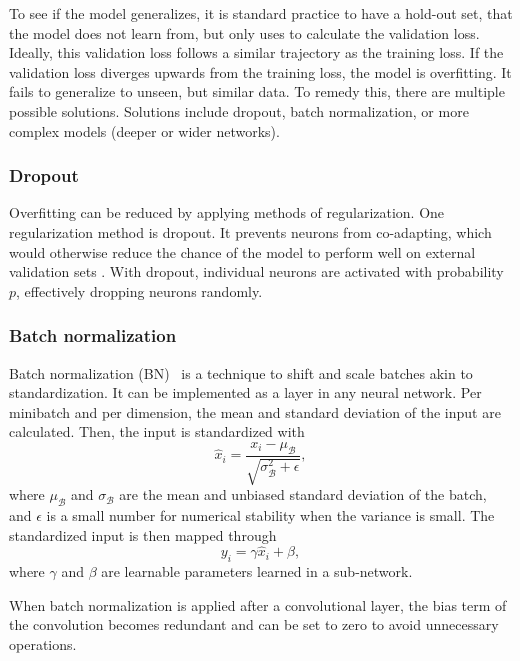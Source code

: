 To see if the model generalizes, it is standard practice to have a hold-out set, that the model does not learn from, but only uses to calculate the validation loss.
Ideally, this validation loss follows a similar trajectory as the training loss.
If the validation loss diverges upwards from the training loss, the model is overfitting.
It fails to generalize to unseen, but similar data.
To remedy this, there are multiple possible solutions.
Solutions include dropout, batch normalization, or more complex models (\ie deeper or wider networks).

\subsubsection{Dropout}\label{sec:dropout}
Overfitting can be reduced by applying methods of regularization.
One regularization method is dropout.
It prevents neurons from co-adapting, which would otherwise reduce the chance of the model to perform well on external validation sets .
With dropout, individual neurons are activated with probability $p$, effectively dropping neurons randomly.

\subsubsection{Batch normalization}\label{sec:bn}
Batch normalization (BN)~ is a technique to shift and scale batches akin to standardization.
It can be implemented as a layer in any neural network.
Per minibatch and per dimension, the mean and standard deviation of the input are calculated.
Then, the input is standardized with
\begin{equation}
    \hat{x}_i = \frac{x_i - \mu_\mathcal{B}}{\sqrt{\sigma_\mathcal{B}^2 + \epsilon}},
\end{equation}
where $\mu_\mathcal{B}$ and $\sigma_\mathcal{B}$ are the mean and unbiased standard deviation of the batch, and $\epsilon$ is a small number for numerical stability when the variance is small.
The standardized input is then mapped through
\begin{equation}
    y_i = \gamma \hat{x}_i + \beta,
\end{equation}
where $\gamma$ and $\beta$ are learnable parameters learned in a sub-network.

When batch normalization is applied after a convolutional layer, the bias term of the convolution becomes redundant and can be set to zero to avoid unnecessary operations.

